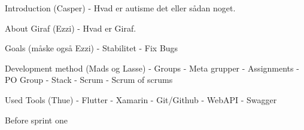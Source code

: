 Introduction (Casper)
    -   Hvad er autisme det eller sådan noget.

About Giraf (Ezzi)
    -   Hvad er Giraf.

Goals (måske også Ezzi)     
    -   Stabilitet
    -   Fix Bugs

Development method (Mads og Lasse)
    -   Groups
        -   Meta grupper
        -   Assignments
        -   PO Group
        -   Stack
    -   Scrum
        -   Scrum of scrums

Used Tools (Thue)
    -   Flutter
    -   Xamarin
    -   Git/Github
    -   WebAPI
    -   Swagger


Before sprint one
